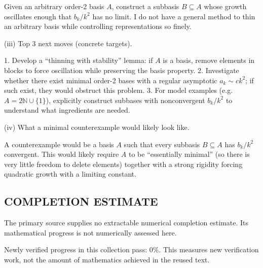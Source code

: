 Given an arbitrary order-2 basis $A$, construct a subbasis $B\subseteq A$ whose growth oscillates enough that $b_k/k^2$ has no limit. I do not have a general method to thin an arbitrary basis while controlling representations so finely.

(iii) Top 3 next moves (concrete targets).

1. Develop a ``thinning with stability'' lemma: if $A$ is a basis, remove elements in blocks to force oscillation while preserving the basis property.
2. Investigate whether there exist minimal order-2 bases with a regular asymptotic $a_k\sim c k^2$; if such exist, they would obstruct this problem.
3. For model examples (e.g. $A=2\mathbb N\cup\{1\}$), explicitly construct subbases with nonconvergent $b_k/k^2$ to understand what ingredients are needed.

(iv) What a minimal counterexample would likely look like.

A counterexample would be a basis $A$ such that every subbasis $B\subseteq A$ has $b_k/k^2$ convergent. This would likely require $A$ to be ``essentially minimal'' (so there is very little freedom to delete elements) together with a strong rigidity forcing quadratic growth with a limiting constant.




\subsection*{COMPLETION ESTIMATE}
The primary source supplies no extractable numerical completion estimate. Its mathematical progress is not numerically assessed here.

Newly verified progress in this collection pass: $0\%$. This measures new verification work, not the amount of mathematics achieved in the reused text.
